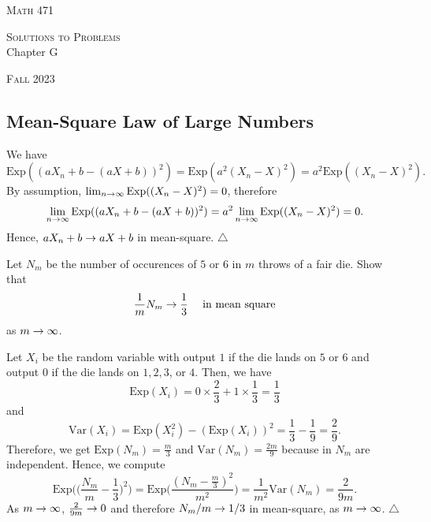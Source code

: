 


\hrulefill

\begin{minipage}{0.33\textwidth}
\textsc{Math 471}
\end{minipage} \hfill 
\begin{minipage}{0.32\textwidth}
\centering
\textsc{Solutions to Problems} \\
Chapter G
\end{minipage}
 \hfill 
 \begin{minipage}{0.33\textwidth}
 \flushright \textsc{Fall 2023}
 \end{minipage}

\hrulefill

\setcounter{section}{7}

\subsection{Mean-Square Law of Large Numbers}

\begin{problem}
We have
    \[
        \mathrm{Exp} ((aX_n + b - (aX + b))^2) = \mathrm{Exp} (a^2 (X_n - X)^2) = a^2 \mathrm{Exp} ( (X_n - X)^2 ) .
    \]
By assumption, $\lim_{n \rightarrow \infty} \mathrm{Exp} ( (X_n - X)^2) = 0$, therefore
    \[
        \lim_{n \rightarrow \infty} \mathrm{Exp} ( (aX_n + b - (aX + b))^2) = a^2 \lim_{n \rightarrow \infty} \mathrm{Exp} ( (X_n - X)^2 ) = 0 . 
    \]
Hence, $aX_n + b \rightarrow aX + b$ in mean-square. \hfill $\triangle$
\end{problem}

\begin{problem}
Let $N_m$ be the number of occurences of $5$ or $6$ in $m$ throws of a fair die. Show that
    \[
        \frac{1}{m} N_m \rightarrow \frac{1}{3} \quad \text{ in mean square}
     \] 
as $m \rightarrow \infty$.

Let $X_i$ be the random variable with output $1$ if the die lands on $5$ or $6$ and output $0$ if the die lands on $1, 2, 3$, or $4$. Then, we have
    \[
        \mathrm{Exp} (X_i) = 0 \times \frac{2}{3} + 1 \times \frac{1}{3} = \frac{1}{3}
    \]
and
    \[
        \mathrm{Var} (X_i ) = \mathrm{Exp} (X_i^2) - (\mathrm{Exp} (X_i))^2 = \frac{1}{3} - \frac{1}{9} = \frac{2}{9} .
    \]
Therefore, we get $\mathrm{Exp} (N_m) = \frac{m}{3}$ and $\mathrm{Var} (N_m ) = \frac{2m}{9}$ because in $N_m$ are independent. Hence, we compute
    \[
        \mathrm{Exp} \Big( \Big( \frac{N_m}{m} - \frac{1}{3} \Big)^2\Big) = \mathrm{Exp} \Big( \frac{(N_m - \frac{m}{3})^2}{m^2} \Big) = \frac{1}{m^2} \mathrm{Var} (N_m) = \frac{2}{9m} .
    \]
As $m \rightarrow \infty$, $\frac{2}{9m} \rightarrow 0$ and therefore $N_m/m \rightarrow 1/3$ in mean-square, as $m \rightarrow \infty$. \hfill $\triangle$
\end{problem}

